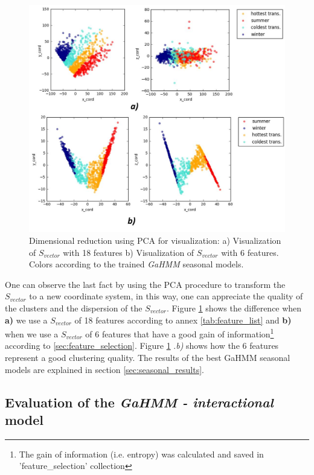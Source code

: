 \begin{figure}[h!]
  \vspace{0.5em} %
  \includegraphics[scale=0.73]{Figures/PCA_visualization_C1-C4.jpg}
  \caption{Dimensional reduction using PCA for visualization: a) Visualization of $S_{vector}$ with 18 features b) Visualization of $S_{vector}$ with 6 features. Colors according to the trained \textit{GaHMM} seasonal models.}
  \label{fig:PCA_visualization}
\end{figure} 


One can observe the last fact by using the PCA procedure to transform the $S_{vector}$ to a new coordinate system, in this way, one can appreciate the quality of the clusters and the dispersion of the $S_{vector}$. Figure \ref{fig:PCA_visualization} shows the difference when \textbf{a)} we use a $S_{vector}$ of 18 features according
to annex \ref{tab:feature_list} and \textbf{b)} when we use a $S_{vector}$ of 6 features that have a good gain of information\footnote{The gain of information (i.e. entropy) was calculated and saved in 'feature\_selection' collection} according to \ref{sec:feature_selection}. Figure \ref{fig:PCA_visualization}{\color{red} .\textit{b)}} shows how the 6 features represent a good clustering quality. The results of the best GaHMM seasonal models are explained in section \ref{sec:seasonal_results}. 


\subsection{Evaluation of the \textit{GaHMM - interactional} model}
\label{sec:interactional_evaluation}


